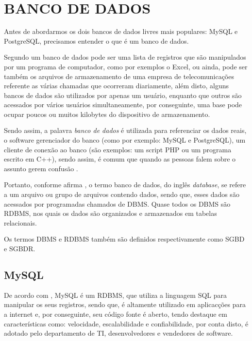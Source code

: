 \section{BANCO DE DADOS}

Antes de abordarmos os dois bancos de dados livres mais populares:
\acs{MySQL} e \acs{PostgreSQL}, precisamos entender o que é um banco de
dados.
 
Segundo  um banco de dados pode ser uma
lista de registros que são manipulados por um programa de computador, como por
exemplos o \acs{Excel}, ou ainda, pode ser também os arquivos de armazenamento
de uma empresa de telecomunicações referente as várias chamadas que ocorreram
diariamente, além disto, alguns bancos de dados são utilizados por apenas um
usuário, enquanto que outros são acessados por vários usuários
simultaneamente, por conseguinte, uma base pode ocupar poucos ou muitos
kilobytes do dispositivo de armazenamento.

Sendo assim, a palavra \textit{banco de dados} é utilizada para referenciar os
dados reais, o software gerenciador do banco (como por exemplo: \acs{MySQL} e 
\acs{PostgreSQL}), um cliente de conexão ao banco (são exemplos: um script
\acs{PHP} ou um programa escrito em C++), sendo assim, é comum que quando as 
pessoas falem sobre o assunto gerem confusão \cite{theDefinitiveGuideToMySQL5}.

Portanto, conforme afirma , o termo banco de
dados, do inglês \textit{database}, se refere a um arquivo ou grupo de arquivos contendo dados, 
sendo que, esses dados são acessados por programadas chamados de \ac{DBMS}.
Quase todos os \acs{DBMS} são \ac{RDBMS}, nos quais
os dados são organizados e armazenados em tabelas relacionais.

Os termos \acs{DBMS} e \acs{RDBMS} também são definidos respectivamente como
\ac{SGBD} e \ac{SGBDR}.

\subsection{MySQL}

De acordo com , \acs{MySQL} é um
\acs{RDBMS},  que utiliza a linguagem \ac{SQL} para manipular os seus registros, 
sendo que, é altamente utilizado em aplicacções para a internet e, por
conseguinte,  seu código fonte é aberto, tendo destaque em características
como: velocidade, escalabilidade e confiabilidade, por conta disto, é adotado
pelo departamento de \ac{TI}, desenvolvedores e vendedores de software.

